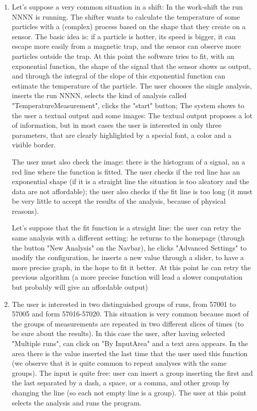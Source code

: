 \begin{enumerate}

\item
Let's suppose a very common situation in a shift: 
In the work-shift the run NNNN is running. The shifter wants to calculate the temperature of some particles with a (complex) process based on the shape that they create on a sensor. The basic idea is: if a particle is hotter, its speed is bigger, it can escape more easily from a magnetic trap, and the sensor can observe more particles outside the trap. At this point the software tries to fit, with an exponential function, the shape of the signal that the sensor shows as output, and through the integral of the slope of this exponential function can estimate the temperature of the particle.
The user chooses the single analysis, inserts the run NNNN, selects the kind of analysis called "TemperatureMeasurement", clicks the "start" button;
The system shows to the user a textual output and some images: 
The textual output proposes a lot of information, but in most cases the user is interested in only three parameters, that are clearly highlighted by a special font, a color and a visible border. 

The user must also check the image: there is the histogram of a signal, an a red line where the function is fitted. The user checks if the red line
has an exponential shape (if it is a straight line the situation is too aleatory and the data are not affordable); the user also checks if the fit line is too long (it must be very little to accept the results of the analysis, because of physical reasons). 

Let's suppose that the fit function is a straight line: the user can retry the same analysis with a different setting: he returns to the homepage (through the button "New Analysis" on the Navbar), he clicks "Advanced Settings" to modify the configuration, he inserts a new value through a slider, to have a more precise graph, in the hope to fit it better. At this point he can retry the previous algorithm (a more precise function will lead a slower computation but probably will give an affordable output)  

\item 
The user is interested in two distinguished groups of runs, from 57001 to 57005 and form 57016-57020.
This situation is very common because most of the groups of measurements are repeated in two different slices of times (to be sure about the results).
In this case the user, after having selected "Multiple runs", can click on "By InputArea" and a text area appears. In the area there is the value inserted the last time that the user used this function (we observe that it is quite common to repeat analyses with the same groups). The input is quite free: user can insert a group inserting the first and the last separated by a dash, a space, or a comma, and other group by changing the line (so each not empty line is a group). 
The user at this point selects the analysis and runs the program. 


\end{enumerate}
